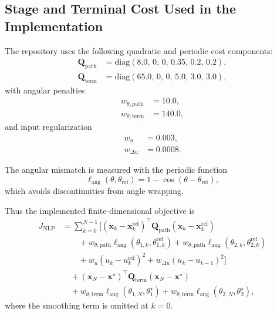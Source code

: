 \documentclass[conference]{IEEEtran}
\begin{document}
\subsection{Stage and Terminal Cost Used in the Implementation}
The repository uses the following quadratic and periodic cost components:
\begin{align}
\bm{Q}_{\mathrm{path}} &= \mathrm{diag}(8.0,\,0,\,0,\,0.35,\,0.2,\,0.2), \\
\bm{Q}_{\mathrm{term}} &= \mathrm{diag}(65.0,\,0,\,0,\,5.0,\,3.0,\,3.0),
\end{align}
with angular penalties
\begin{align}
w_{\theta,\mathrm{path}} &= 10.0, \\
w_{\theta,\mathrm{term}} &= 140.0,
\end{align}
and input regularization
\begin{align}
w_u &= 0.003, \\
w_{\Delta u} &= 0.0008.
\end{align}

The angular mismatch is measured with the periodic function
\begin{equation}
\ell_{\mathrm{ang}}(\theta,\theta_{\mathrm{ref}})
=
1-\cos(\theta-\theta_{\mathrm{ref}}),
\end{equation}
which avoids discontinuities from angle wrapping.

Thus the implemented finite-dimensional objective is
\begin{align}
J_{\mathrm{NLP}}
&=
\sum_{k=0}^{N-1}
\Big[
(\bm{x}_k-\bm{x}^{\mathrm{ref}}_k)^{\top}\bm{Q}_{\mathrm{path}}(\bm{x}_k-\bm{x}^{\mathrm{ref}}_k)
\nonumber\\
&\qquad
+ w_{\theta,\mathrm{path}}\ell_{\mathrm{ang}}(\theta_{1,k},\theta^{\mathrm{ref}}_{1,k})
+ w_{\theta,\mathrm{path}}\ell_{\mathrm{ang}}(\theta_{2,k},\theta^{\mathrm{ref}}_{2,k})
\nonumber\\
&\qquad
+ w_u (u_k-u_k^{\mathrm{ref}})^2
+ w_{\Delta u}(u_k-u_{k-1})^2
\Big]
\nonumber\\
&\quad
+ (\bm{x}_N-\bm{x}^{\star})^{\top}\bm{Q}_{\mathrm{term}}(\bm{x}_N-\bm{x}^{\star})
\nonumber\\
&\quad
+ w_{\theta,\mathrm{term}}\ell_{\mathrm{ang}}(\theta_{1,N},\theta_1^{\star})
+ w_{\theta,\mathrm{term}}\ell_{\mathrm{ang}}(\theta_{2,N},\theta_2^{\star}),
\label{eq:implemented_nlp_cost}
\end{align}
where the smoothing term is omitted at $k=0$.
\end{document}

